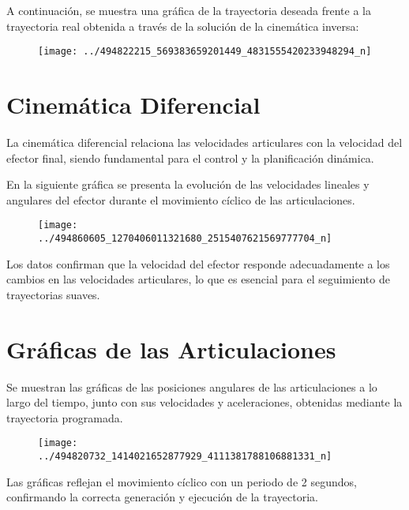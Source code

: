 A continuación, se muestra una gráfica de la trayectoria deseada frente a la trayectoria real obtenida a través de la solución de la cinemática inversa:

\begin{figure}
	\centering
	\texttt{[image: ../494822215\_569383659201449\_4831555420233948294\_n]}
	\caption{}
	\label{fig:4948222155693836592014494831555420233948294n}
\end{figure}



\section{Cinemática Diferencial}

La cinemática diferencial relaciona las velocidades articulares con la velocidad del efector final, siendo fundamental para el control y la planificación dinámica.

En la siguiente gráfica se presenta la evolución de las velocidades lineales y angulares del efector durante el movimiento cíclico de las articulaciones.

\begin{figure}
	\centering
	\texttt{[image: ../494860605\_1270406011321680\_2515407621569777704\_n]}
	\caption{}
	\label{fig:49486060512704060113216802515407621569777704n}
\end{figure}



Los datos confirman que la velocidad del efector responde adecuadamente a los cambios en las velocidades articulares, lo que es esencial para el seguimiento de trayectorias suaves.

\section{Gráficas de las Articulaciones}

Se muestran las gráficas de las posiciones angulares de las articulaciones a lo largo del tiempo, junto con sus velocidades y aceleraciones, obtenidas mediante la trayectoria programada.

\begin{figure}
	\centering
	\texttt{[image: ../494820732\_1414021652877929\_4111381788106881331\_n]}
	\caption{}
	\label{fig:49482073214140216528779294111381788106881331n}
\end{figure}


Las gráficas reflejan el movimiento cíclico con un periodo de 2 segundos, confirmando la correcta generación y ejecución de la trayectoria.

